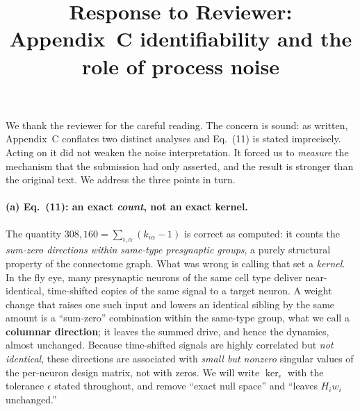 \documentclass[11pt]{article}
\title{\vspace{-2.5em}Response to Reviewer: Appendix~C identifiability and the role of process noise}
\date{}
\author{}
\begin{document}
\maketitle
\vspace{-3em}

We thank the reviewer for the careful reading. The concern is sound: as written,
Appendix~C conflates two distinct analyses and Eq.~(11) is stated imprecisely.
Acting on it did not weaken the noise interpretation. It forced us to
\emph{measure} the mechanism that the submission had only asserted, and the
result is stronger than the original text. We address the three points in turn.

\paragraph{(a) Eq.~(11): an exact \emph{count}, not an exact kernel.}
The quantity $308{,}160=\sum_{i,\alpha}(k_{i\alpha}-1)$ is correct as computed:
it counts the \emph{sum-zero directions within same-type presynaptic groups}, a
purely structural property of the connectome graph. What was wrong is calling
that set a \emph{kernel}. In the fly eye, many presynaptic neurons of the same
cell type deliver near-identical, time-shifted copies of the same signal to a
target neuron. A weight change that raises one such input and lowers an identical
sibling by the same amount is a ``sum-zero'' combination within the same-type
group, what we call a \textbf{columnar direction}; it leaves the summed drive,
and hence the dynamics, almost unchanged. Because time-shifted signals are highly
correlated but \emph{not identical}, these directions are associated with
\emph{small but nonzero} singular values of the per-neuron design matrix, not with
zeros. We will write $\ker_\epsilon$ with the tolerance $\epsilon$ stated
throughout, and remove ``exact null space'' and ``leaves $H_iw_i$ unchanged.''
\end{document}
